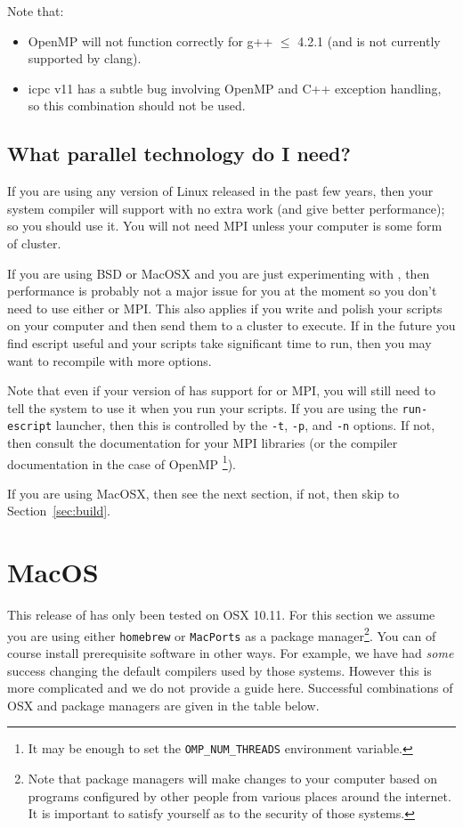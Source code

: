 Note that:
\begin{itemize}
 \item OpenMP will not function correctly for g++ $\leq$ 4.2.1 (and is not currently supported by clang).
 \item icpc v11 has a subtle bug involving OpenMP and C++ exception handling, so this combination should not be used.
\end{itemize}

\subsection{What parallel technology do I need?}\label{sec:needpar}
If you are using any version of Linux released in the past few years, then your system compiler will support 
\openmp with no extra work (and give better performance); so you should use it.
You will not need MPI unless your computer is some form of cluster.

If you are using BSD or MacOSX and you are just experimenting with \escript, then performance is
probably not a major issue for you at the moment so you don't need to use either \openmp or MPI. 
This also applies if you write and polish your scripts on your computer and then send them to a cluster to execute.
If in the future you find escript useful and your scripts take significant time to run, then you may want to recompile 
\escript with more options.



Note that even if your version of \escript has support for \openmp or MPI, you will still need to tell the system to 
use it when you run your scripts.
If you are using the \texttt{run-escript} launcher, then this is controlled by
the \texttt{-t}, \texttt{-p}, and \texttt{-n} options.
If not, then consult the documentation for your MPI libraries (or the compiler documentation in the case of OpenMP
\footnote{It may be enough to set the \texttt{OMP\_NUM\_THREADS} environment variable.}).

If you are using MacOSX, then see the next section, if not, then skip to Section~\ref{sec:build}.

\section{MacOS}
This release of \escript has only been tested on OSX 10.11.
For this section we assume you are using either \texttt{homebrew} or \texttt{MacPorts} as a package 
manager\footnote{Note that package managers will make changes to your computer based on programs configured by other people from 
various places around the internet. It is important to satisfy yourself as to the security of those systems.}.
You can of course install prerequisite software in other ways.
For example, we have had \emph{some} success changing the default 
compilers used by those systems. However this is more complicated and we do not provide a guide here.
Successful combinations of OSX and package managers are given in the table below.

